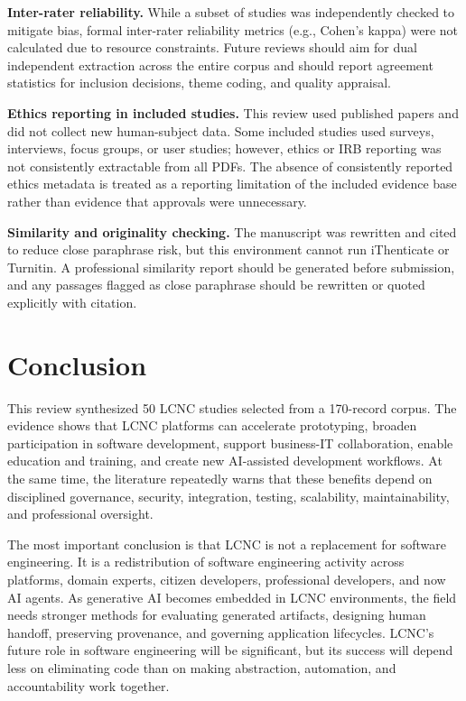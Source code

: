 \documentclass[conference]{IEEEtran}
\begin{document}
\textbf{Inter-rater reliability.} While a subset of studies was independently checked to mitigate bias, formal inter-rater reliability metrics (e.g., Cohen's kappa) were not calculated due to resource constraints. Future reviews should aim for dual independent extraction across the entire corpus and should report agreement statistics for inclusion decisions, theme coding, and quality appraisal.

\textbf{Ethics reporting in included studies.} This review used published papers and did not collect new human-subject data. Some included studies used surveys, interviews, focus groups, or user studies; however, ethics or IRB reporting was not consistently extractable from all PDFs. The absence of consistently reported ethics metadata is treated as a reporting limitation of the included evidence base rather than evidence that approvals were unnecessary.

\textbf{Similarity and originality checking.} The manuscript was rewritten and cited to reduce close paraphrase risk, but this environment cannot run iThenticate or Turnitin. A professional similarity report should be generated before submission, and any passages flagged as close paraphrase should be rewritten or quoted explicitly with citation.



\balance
\section{Conclusion}
This review synthesized 50 LCNC studies selected from a 170-record corpus. The evidence shows that LCNC platforms can accelerate prototyping, broaden participation in software development, support business-IT collaboration, enable education and training, and create new AI-assisted development workflows. At the same time, the literature repeatedly warns that these benefits depend on disciplined governance, security, integration, testing, scalability, maintainability, and professional oversight.

The most important conclusion is that LCNC is not a replacement for software engineering. It is a redistribution of software engineering activity across platforms, domain experts, citizen developers, professional developers, and now AI agents. As generative AI becomes embedded in LCNC environments, the field needs stronger methods for evaluating generated artifacts, designing human handoff, preserving provenance, and governing application lifecycles. LCNC's future role in software engineering will be significant, but its success will depend less on eliminating code than on making abstraction, automation, and accountability work together.
\end{document}
